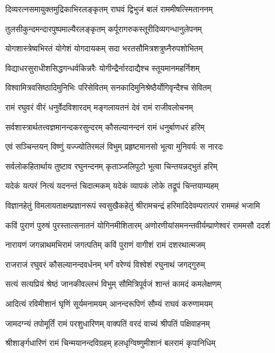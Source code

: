 \twolineshloka
{दिव्यरत्नसमायुक्तमुद्रिकाभिरलङ्कृतम्}
{राघवं द्विभुजं बालं राममीषत्स्मिताननम्}%

\twolineshloka
{तुलसीकुन्दमन्दारपुष्पमाल्यैरलङ्कृतम्}
{कर्पूरागरुकस्तूरीदिव्यगन्धानुलेपनम्}%

\twolineshloka
{योगशास्त्रेष्वभिरतं योगेशं योगदायकम्}
{सदा भरतसौमित्रशत्रुघ्नैरुपशोभितम्}%

\twolineshloka
{विद्याधरसुराधीशसिद्धगन्धर्वकिन्नरैः}
{योगीन्द्रैर्नारदाद्यैश्च स्तूयमानमहर्निशम्}%

\twolineshloka
{विश्वामित्रवसिष्ठादिमुनिभिः परिसेवितम्}
{सनकादिमुनिश्रेष्ठैर्योगिवृन्दैश्च सेवितम्}%

\twolineshloka
{रामं रघुवरं वीरं धनुर्वेदविशारदम्}
{मङ्गलायतनं देवं रामं राजीवलोचनम्}%

\twolineshloka
{सर्वशास्त्रार्थतत्त्वज्ञमानन्दकरसुन्दरम्}
{कौसल्यानन्दनं रामं धनुर्बाणधरं हरिम्}%

\twolineshloka
{एवं सञ्चिन्तयन् विष्णुं यज्ज्योतिरमलं विभुम्}
{प्रहृष्टमानसो भूत्वा मुनिवर्यः स नारदः}%

\twolineshloka
{सर्वलोकहितार्थाय तुष्टाव रघुनन्दनम्}
{कृताञ्जलिपुटो भूत्वा चिन्तयन्नद्भुतं हरिम्}%

\twolineshloka
{यदेकं यत्परं नित्यं यदनन्तं चिदात्मकम्}
{यदेकं व्यापकं लोके तद्रूपं चिन्तयाम्यहम्}%

\fourlineindentedshloka
{विज्ञानहेतुं विमलायताक्षम्}{प्रज्ञानरूपं स्वसुखैकहेतुं}
{श्रीरामचन्द्रं हरिमादिदेवम्}{परात्परं राममहं भजामि}%

\fourlineindentedshloka
{कविं पुराणं पुरुषं पुरस्तात्}{सनातनं योगिनमीशितारम्}
{अणोरणीयांसमनन्तवीर्यम्}{प्राणेश्वरं राममसौ ददर्श}%

\twolineshloka
{नारायणं जगन्नाथमभिरामं जगत्पतिम्}
{कविं पुराणं वागीशं रामं दशरथात्मजम्}%

\twolineshloka
{राजराजं रघुवरं कौसल्यानन्दवर्धनम्}
{भर्गं वरेण्यं विश्वेशं रघुनाथं जगद्गुरुम्}%

\twolineshloka
{सत्यं सत्यप्रियं श्रेष्ठं जानकीवल्लभं विभुम्}
{सौमित्रिपूर्वजं शान्तं कामदं कमलेक्षणम्}%

\twolineshloka
{आदित्यं रविमीशानं घृणिं सूर्यमनामयम्}
{आनन्दरूपिणं सौम्यं राघवं करुणामयम्}%

\twolineshloka
{जामदग्न्यं तपोमूर्तिं रामं परशुधारिणम्}
{वाक्पतिं वरदं वाच्यं श्रीपतिं पक्षिवाहनम्}%

\twolineshloka
{श्रीशार्ङ्गधारिणं रामं चिन्मयानन्दविग्रहम्}
{हलधृग्विष्णुमीशानं बलरामं कृपानिधिम्}%

